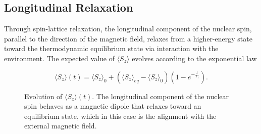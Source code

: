\subsection{Longitudinal Relaxation}
\label{subsec:longitudinal_relaxation}

Through spin-lattice relaxation, the longitudinal component of the nuclear spin, parallel to the direction of the magnetic field, relaxes from a higher-energy state toward the thermodynamic equilibrium state via interaction with the environment. The expected value of \(\langle S_z\rangle\) evolves according to the exponential law

\begin{equation}
    \langle S_z\rangle(t)=\langle S_z\rangle_0+(\langle S_z\rangle_{eq}-\langle S_z\rangle_0)(1-e^{-\frac{t}{T_1}}).
    \label{eq:T1_relaxation}
\end{equation}

\begin{figure}[htb]
\centering
{}
\caption{Evolution of $\langle S_z\rangle(t)$. The longitudinal component of the nuclear spin behaves as a magnetic dipole that relaxes toward an equilibrium state, which in this case is the alignment with the external magnetic field.}
\label{fig:longitudinalrelaxation}
\end{figure}


